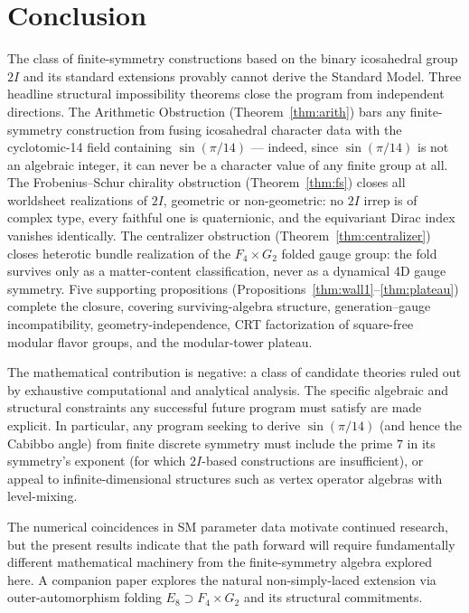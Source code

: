 \documentclass[11pt,a4paper]{amsart}
\theoremstyle{definition}
\theoremstyle{remark}
\begin{document}
\section{Conclusion}

The class of finite-symmetry constructions based on the binary icosahedral
group $2I$ and its standard extensions provably cannot derive the Standard
Model. Three headline structural impossibility theorems close the program
from independent directions. The Arithmetic Obstruction
(Theorem~\ref{thm:arith}) bars any finite-symmetry construction from fusing
icosahedral character data with the cyclotomic-14 field containing
$\sin(\pi/14)$ --- indeed, since $\sin(\pi/14)$ is not an algebraic integer,
it can never be a character value of any finite group at all. The
Frobenius--Schur chirality obstruction (Theorem~\ref{thm:fs}) closes all
worldsheet realizations of $2I$, geometric or non-geometric: no $2I$ irrep
is of complex type, every faithful one is quaternionic, and the equivariant
Dirac index vanishes identically. The centralizer obstruction
(Theorem~\ref{thm:centralizer}) closes heterotic bundle realization of the
$F_4 \times G_2$ folded gauge group: the fold survives only as a
matter-content classification, never as a dynamical 4D gauge symmetry. Five
supporting propositions (Propositions~\ref{thm:wall1}--\ref{thm:plateau})
complete the closure, covering surviving-algebra structure,
generation--gauge incompatibility, geometry-independence, CRT factorization
of square-free modular flavor groups, and the modular-tower plateau.

The mathematical contribution is negative: a class of candidate theories
ruled out by exhaustive computational and analytical analysis. The specific
algebraic and structural constraints any successful future program must
satisfy are made explicit. In particular, any program seeking to derive
$\sin(\pi/14)$ (and hence the Cabibbo angle) from finite discrete symmetry
must include the prime $7$ in its symmetry's exponent (for which $2I$-based
constructions are insufficient), or appeal to infinite-dimensional structures
such as vertex operator algebras with level-mixing.

The numerical coincidences in SM parameter data motivate continued research,
but the present results indicate that the path forward will require
fundamentally different mathematical machinery from the finite-symmetry
algebra explored here. A companion paper \cite{paper3} explores the natural
non-simply-laced extension via outer-automorphism folding $E_8 \supset F_4 \times G_2$
and its structural commitments.
\end{document}
